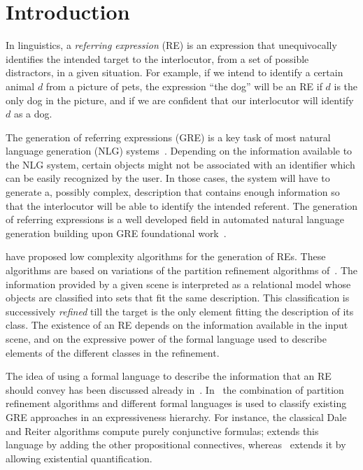 \section{Introduction}\label{sec:gre}

In linguistics, a \emph{referring expression} (RE) is an expression that 
unequivocally identifies the intended target to the interlocutor, from a set of possible distractors, in a given situation.  
For example, if we intend to identify a certain animal $d$ from a picture of pets, the expression 
``the dog'' will be an RE if $d$ is the only dog in the picture, and if we are confident
that our interlocutor will identify $d$ as a dog. 

The generation of referring expressions (GRE)  is a key task of most natural 
language generation (NLG) systems~\cite[Section 5.4]{dale2000}. 
Depending on the information available to the NLG system, certain objects might 
not be associated with an identifier which can be easily recognized by the user. 
In those cases, the system will have to generate a, possibly complex, description that contains 
enough information so that the interlocutor will be able to identify the intended referent.
The generation of referring expressions is a well developed field in automated natural language generation building upon GRE foundational work~\cite{winograd,dale89cooking,Dale1995}. 

\cite{arec2:2008:Areces,arec:usin11} have proposed low complexity algorithms for the generation 
of REs. These algorithms are based on variations of the partition refinement algorithms of~\cite{paig:thre87}.
The information provided by a given scene is interpreted as a relational model whose 
objects are classified into sets that fit the same description.  
This classification is successively \emph{refined}  till the target 
is the only element fitting the description of its class.  The existence of an RE 
depends on the information available in the input scene, and on the expressive power of the formal 
language used to describe elements of the different classes in the refinement. 

The idea of using a formal language to describe the information that an RE should convey has been discussed 
already in~\cite{Krahmer2003,gardent07:_gener_bridg_defin_descr}.  In~\cite{arec2:2008:Areces,arec:usin11} the 
combination of partition refinement algorithms and different formal languages is used to classify existing 
GRE approaches in an expressiveness hierarchy.  For instance, the classical Dale and Reiter algorithms
compute purely conjunctive formulas; \cite{deemter02:_gener_refer_expres} extends this language by
adding the other propositional connectives, whereas~\cite{dale91:_gener_refer_expres_invol_relat} extends it by
allowing existential quantification.

